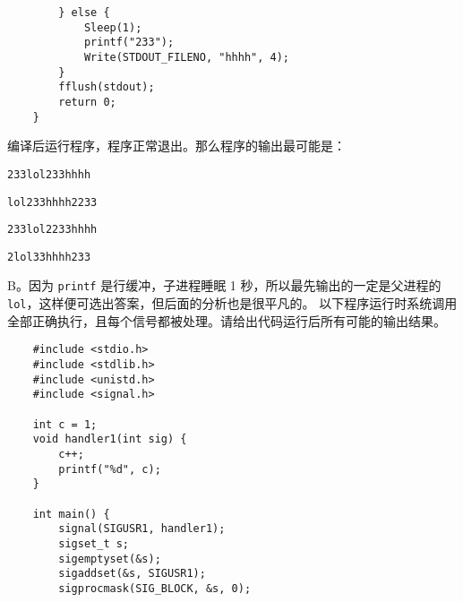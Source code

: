 \begin{problems}
\begin{verbatim}
        } else {
            Sleep(1);
            printf("233");
            Write(STDOUT_FILENO, "hhhh", 4);
        }
        fflush(stdout);
        return 0;
    }
        \end{verbatim}
        编译后运行程序，程序正常退出。那么程序的输出最可能是：
        \begin{choices}
            \item \verb|233lol233hhhh|
            \item \verb|lol233hhhh2233|
            \item \verb|233lol2233hhhh|
            \item \verb|2lol33hhhh233|
        \end{choices}
        \sol B。因为 \verb|printf| 是行缓冲，子进程睡眠 1 秒，所以最先输出的一定是父进程的 \verb|lol|，这样便可选出答案，但后面的分析也是很平凡的。
         以下程序运行时系统调用全部正确执行，且每个信号都被处理。请给出代码运行后所有可能的输出结果。
        \begin{verbatim}
    #include <stdio.h>
    #include <stdlib.h>
    #include <unistd.h>
    #include <signal.h>

    int c = 1;
    void handler1(int sig) {
        c++;
        printf("%d", c);
    }

    int main() {
        signal(SIGUSR1, handler1);
        sigset_t s;
        sigemptyset(&s);
        sigaddset(&s, SIGUSR1);
        sigprocmask(SIG_BLOCK, &s, 0);


\end{verbatim}
\end{problems}
